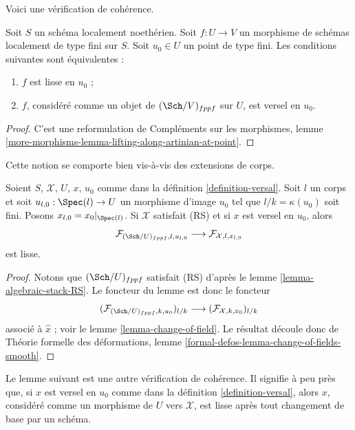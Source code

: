 \noindent
Voici une vérification de cohérence.

\begin{lemma}
\label{lemma-versal-implies-smooth}
Soit $S$ un schéma localement noethérien. Soit $f : U \to V$ un morphisme de
schémas localement de type fini sur $S$. Soit $u_0 \in U$ un point de type
fini. Les conditions suivantes sont équivalentes :
\begin{enumerate}
\item $f$ est lisse en $u_0$ ;
\item $f$, considéré comme un objet de $(\Sch/V)_{fppf}$ sur $U$, est versel
en $u_0$.
\end{enumerate}
\end{lemma}

\begin{proof}
C'est une reformulation de Compléments sur les morphismes, lemme
\ref{more-morphisms-lemma-lifting-along-artinian-at-point}.
\end{proof}

\noindent
Cette notion se comporte bien vis-à-vis des extensions de corps.

\begin{lemma}
\label{lemma-versal-change-of-field}
Soient $S$, $\mathcal{X}$, $U$, $x$, $u_0$ comme dans la définition
\ref{definition-versal}. Soit $l$ un corps et soit
$u_{l, 0} : \Spec(l) \to U$ un morphisme d'image $u_0$ tel que
$l/k = \kappa(u_0)$ soit fini. Posons $x_{l, 0} = x_0|_{\Spec(l)}$.
Si $\mathcal{X}$ satisfait (RS) et si $x$ est versel en $u_0$, alors
$$
\mathcal{F}_{(\Sch/U)_{fppf}, l, u_{l, 0}}
\longrightarrow
\mathcal{F}_{\mathcal{X}, l, x_{l, 0}}
$$
est lisse.
\end{lemma}

\begin{proof}
Notons que $(\Sch/U)_{fppf}$ satisfait (RS) d'après le lemme
\ref{lemma-algebraic-stack-RS}. Le foncteur du lemme est donc le foncteur
$$
(\mathcal{F}_{(\Sch/U)_{fppf}, k , u_0})_{l/k}
\longrightarrow
(\mathcal{F}_{\mathcal{X}, k , x_0})_{l/k}
$$
associé à $\hat x$ ; voir le lemme \ref{lemma-change-of-field}. Le résultat
découle donc de Théorie formelle des déformations, lemme
\ref{formal-defos-lemma-change-of-fields-smooth}.
\end{proof}

\noindent
Le lemme suivant est une autre vérification de cohérence. Il signifie à peu
près que, si $x$ est versel en $u_0$ comme dans la définition
\ref{definition-versal}, alors $x$, considéré comme un morphisme de $U$ vers
$\mathcal{X}$, est lisse après tout changement de base par un schéma.

